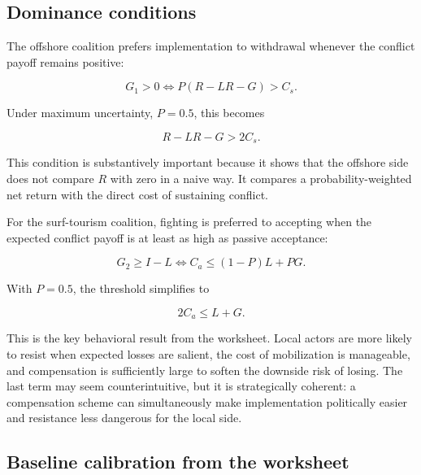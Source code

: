 \subsection{Dominance conditions}

The offshore coalition prefers implementation to withdrawal whenever the conflict payoff remains positive:

\begin{equation}
G_1 > 0 \Longleftrightarrow P(R-LR-G) > C_s.
\label{eq:offshore_condition}
\end{equation}

Under maximum uncertainty, $P=0.5$, this becomes

\begin{equation}
R-LR-G > 2C_s.
\label{eq:offshore_condition_half}
\end{equation}

This condition is substantively important because it shows that the offshore side does not compare $R$ with zero in a naive way. It compares a probability-weighted net return with the direct cost of sustaining conflict.

For the surf-tourism coalition, fighting is preferred to accepting when the expected conflict payoff is at least as high as passive acceptance:

\begin{equation}
G_2 \geq I-L \Longleftrightarrow C_a \leq (1-P)L + PG.
\label{eq:opponent_condition}
\end{equation}

With $P=0.5$, the threshold simplifies to

\begin{equation}
2C_a \leq L + G.
\label{eq:opponent_condition_half}
\end{equation}

This is the key behavioral result from the worksheet. Local actors are more likely to resist when expected losses are salient, the cost of mobilization is manageable, and compensation is sufficiently large to soften the downside risk of losing. The last term may seem counterintuitive, but it is strategically coherent: a compensation scheme can simultaneously make implementation politically easier and resistance less dangerous for the local side.

\subsection{Baseline calibration from the worksheet}

